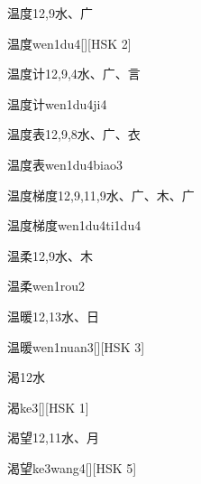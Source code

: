 \begin{entry}{温度}{12,9}{⽔、⼴}
  \begin{phonetics}{温度}{wen1du4}[][HSK 2]
  \end{phonetics}
\end{entry}

\begin{entry}{温度计}{12,9,4}{⽔、⼴、⾔}
  \begin{phonetics}{温度计}{wen1du4ji4}
  \end{phonetics}
\end{entry}

\begin{entry}{温度表}{12,9,8}{⽔、⼴、⾐}
  \begin{phonetics}{温度表}{wen1du4biao3}
  \end{phonetics}
\end{entry}

\begin{entry}{温度梯度}{12,9,11,9}{⽔、⼴、⽊、⼴}
  \begin{phonetics}{温度梯度}{wen1du4ti1du4}
  \end{phonetics}
\end{entry}

\begin{entry}{温柔}{12,9}{⽔、⽊}
  \begin{phonetics}{温柔}{wen1rou2}
  \end{phonetics}
\end{entry}

\begin{entry}{温暖}{12,13}{⽔、⽇}
  \begin{phonetics}{温暖}{wen1nuan3}[][HSK 3]
  \end{phonetics}
\end{entry}

\begin{entry}{渴}{12}{⽔}
  \begin{phonetics}{渴}{ke3}[][HSK 1]
  \end{phonetics}
\end{entry}

\begin{entry}{渴望}{12,11}{⽔、⽉}
  \begin{phonetics}{渴望}{ke3wang4}[][HSK 5]
  \end{phonetics}
\end{entry}

